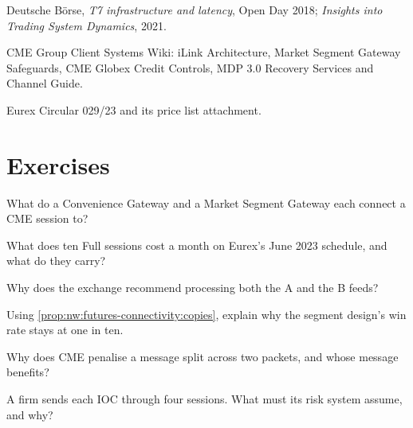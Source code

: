 \begin{omsources}
\item Deutsche Börse, \emph{T7 infrastructure and latency}, Open Day 2018; \emph{Insights into Trading System Dynamics}, 2021.
\item CME Group Client Systems Wiki: iLink Architecture, Market Segment Gateway Safeguards, CME Globex Credit Controls, MDP 3.0
  Recovery Services and Channel Guide.
\item Eurex Circular 029/23 and its price list attachment.
\end{omsources}

\section{Exercises}

\begin{exercise}[$\star$]\label{exo:nw:futures-connectivity:1}
What do a Convenience Gateway and a Market Segment Gateway each connect a CME session to?
\end{exercise}

\begin{exercise}[$\star$]\label{exo:nw:futures-connectivity:2}
What does ten Full sessions cost a month on Eurex's June 2023 schedule, and what do they carry?
\end{exercise}

\begin{exercise}[$\star$]\label{exo:nw:futures-connectivity:3}
Why does the exchange recommend processing both the A and the B feeds?
\end{exercise}

\begin{exercise}[$\star\star$]\label{exo:nw:futures-connectivity:4}
Using \cref{prop:nw:futures-connectivity:copies}, explain why the segment design's win rate stays at one in ten.
\end{exercise}

\begin{exercise}[$\star\star$]\label{exo:nw:futures-connectivity:5}
Why does CME penalise a message split across two packets, and whose message benefits?
\end{exercise}

\begin{exercise}[$\star\star$]\label{exo:nw:futures-connectivity:6}
A firm sends each IOC through four sessions. What must its risk system assume, and why?
\end{exercise}

